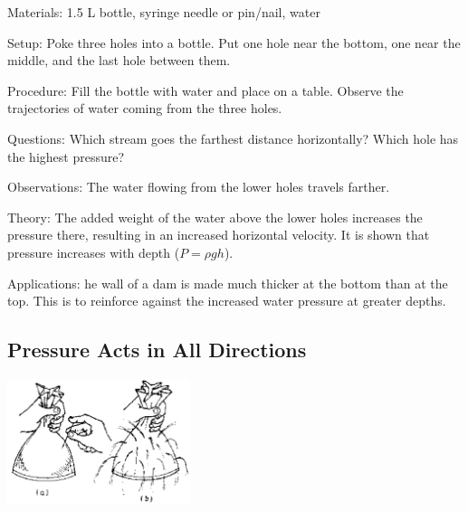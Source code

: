 \begin{multicols}{2}
\begin{description*}
\item[Materials:]{1.5 L bottle, syringe needle or pin/nail, water}
\item[Setup:]{Poke three holes into a bottle. Put one hole near the bottom, one near the middle, and the last hole between them.}
\item[Procedure:]{Fill the bottle with water and place on a table. Observe the trajectories of water coming from the three holes.}
\item[Questions:]{Which stream goes the farthest distance horizontally? Which hole has the highest pressure?}
\item[Observations:]{The water flowing from the lower holes travels farther.}
\item[Theory:]{The added weight of the water above the lower holes increases the pressure there, resulting in an increased horizontal velocity. It is shown that pressure increases with depth ($P = \rho g h$).}
\item[Applications:]{he wall of a dam is made much thicker at the bottom than at the top. This is to reinforce against the increased water pressure at greater depths.}
\end{description*}

\subsection{Pressure Acts in All Directions}

\begin{center}
\includegraphics[width=0.4\textwidth]{./img/source/pressure-direction.png}
\end{center}


\end{multicols}
